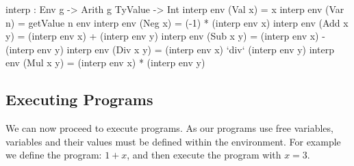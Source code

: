 \begin{code}
interp : Env g -> Arith g TyValue -> Int
interp env (Val x)    = x
interp env (Var n)    = getValue n env
interp env (Neg x)    = (-1) * (interp env x)
interp env (Add x y)  = (interp env x) + (interp env y)
interp env (Sub x y)  = (interp env x) - (interp env y)
interp env (Div x y)  = (interp env x) `div` (interp env y)
interp env (Mul x y)  = (interp env x) * (interp env y)
\end{code}

\subsection{Executing Programs}
\label{sec:typed-arith-var:running}

We can now proceed to execute programs.
As our programs use free variables, variables and their values must be defined within the environment.
For example we define the program: $1 + x$, and then execute the program with $x=3$.


